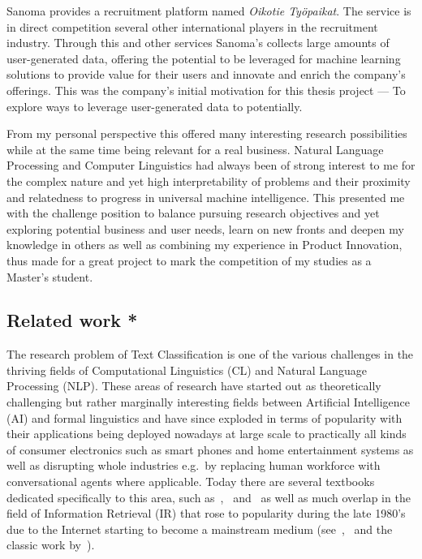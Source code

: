 Sanoma provides a recruitment platform named \emph{Oikotie Työpaikat}. The service is in direct competition several other international players in the recruitment industry. Through this and other services Sanoma's collects large amounts of user-generated data, offering the potential to be leveraged for machine learning solutions to provide value for their users and innovate and enrich the company's offerings.
This was the company's initial motivation for this thesis project --- To explore ways to leverage user-generated data to potentially.



From my personal perspective this offered many interesting research possibilities while at the same time being relevant for a real business. Natural Language Processing and Computer Linguistics had always been of strong interest to me for the complex nature and yet high interpretability of problems and their proximity and relatedness to progress in universal machine intelligence. This presented me with the challenge position to balance pursuing research objectives and yet exploring potential business and user needs, learn on new fronts and deepen my knowledge in others as well as combining my experience in Product Innovation, thus made for a great project to mark the competition of my studies as a Master's student.


\subsection{Related work *}

The research problem of Text Classification is one of the various challenges in the thriving fields of Computational Linguistics (CL) and Natural Language Processing (NLP). These areas of research have started out as theoretically challenging but rather marginally interesting fields between Artificial Intelligence (AI) and formal linguistics and have since exploded in terms of popularity with their applications being deployed nowadays at large scale to practically all kinds of consumer electronics such as smart phones and home entertainment systems as well as disrupting whole industries e.g.\ by replacing human workforce with conversational agents where applicable.
Today there are several textbooks dedicated specifically to this area, such as~\cite{Manning:1999aa},~\cite{Jurafsky:2014aa} and~\cite{Clark:2013aa} as well as much overlap in the field of Information Retrieval (IR) that rose to popularity during the late 1980's due to the Internet starting to become a mainstream medium (see~\cite{Manning:2008aa},~\cite{Leskovec:2014aa} and the classic work by~\cite{Rijsbergen:1979aa}).

